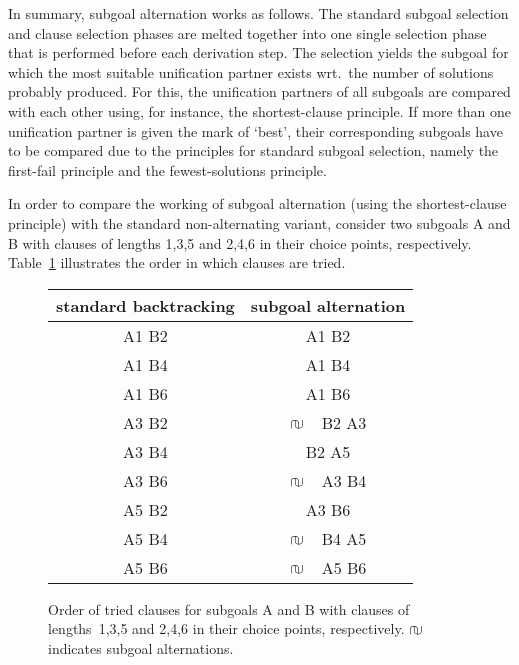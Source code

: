In summary, subgoal alternation works as follows.
The standard subgoal selection and clause selection phases are melted
together into one single selection phase that is performed before each
derivation step. 
The selection yields the subgoal for which the most suitable
unification partner exists wrt.\ the number of solutions probably
produced. 
For this, the unification partners of all subgoals are compared with
each other using, for instance, the shortest-clause principle. 
If more than one unification partner is given the mark of `best',
their corresponding subgoals have to be compared due to the principles
for standard subgoal selection, namely the first-fail principle and
the fewest-solutions principle. 

In order to compare the working of subgoal alternation (using the
shortest-clause principle) with the standard non-alternating variant,
consider two subgoals \/A\/ and \/B\/ with clauses of lengths 1,3,5
and 2,4,6 in their choice points, respectively. 
Table~\ref{figure:comparison} illustrates the order in which clauses
are tried. 

\newcommand{\alt}{$\cap\hspace*{-.9ex}\cup \ \  $}

\begin{figure}\label{figure:comparison}
\begin{center}
\begin{tabular}{|c|c|}
\hline
standard backtracking & subgoal alternation \\ \hline
A1 B2	& \phantom{\alt} A1 B2	\\                  
A1 B4	& \phantom{\alt} A1 B4	\\                  
A1 B6	& \phantom{\alt} A1 B6	\\                  
A3 B2	& \alt\          B2 A3	\\                  
A3 B4	& \phantom{\alt} B2 A5	\\                  
A3 B6	& \alt\          A3 B4	\\                  
A5 B2	& \phantom{\alt} A3 B6	\\                  
A5 B4	& \alt\          B4 A5	\\                  
A5 B6	& \alt\          A5 B6	\\ \hline
\end{tabular}
\end{center}
\caption{Order of tried clauses for subgoals \/A\/ and \/B\/ with
	clauses of lengths~1,3,5 and 2,4,6 in their choice points,
	respectively. 
	\protect\alt indicates subgoal alternations.}
\end{figure}

